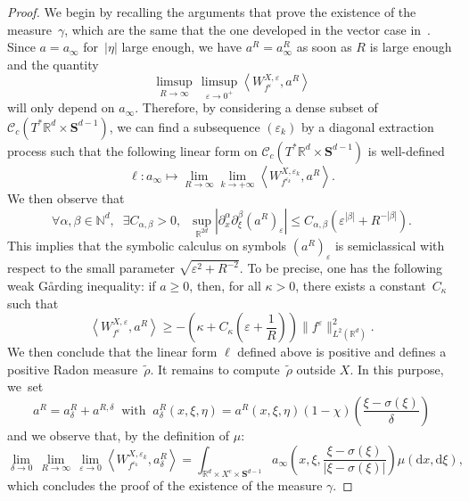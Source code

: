 \documentclass[10pt]{amsart}
\theoremstyle{definition}
\newcommand*\R{{\mathbb R}}
\newcommand*\N{{\mathbb N}}
\newcommand*\eps{\varepsilon}
\numberwithin{equation}{section}
\let\oldexists\exists
\renewcommand*{\exists}{\mathrel{\oldexists}}
\let\oldforall\forall
\renewcommand*{\forall}{\mathrel{\oldforall}}
\newcommand*{\dd}{\mathrm{d}}
\newcommand*{\dx}{\dd x}
\newcommand*{\dxi}{\dd \xi}
\begin{document}
\begin{proof}
We begin by recalling the arguments that prove the existence of the measure~$\gamma$, which are the same that the one developed in the vector case in~\cite{CFMProc}.
Since $a=a_\infty$ for~$|\eta|$ large enough, we have $a^R=a_\infty^R$ as soon as $R$ is large enough and the quantity
\[
\limsup_{R\to\infty}\, \limsup_{\eps\to 0^+}\left\langle W^{X,\eps}_{f^\eps},a^{R}\right\rangle
\]
will only depend on $a_\infty$. Therefore, by considering a dense subset of ${\mathcal C}_c(T^*\R^{d}\times \mathbf{S}^{d-1})$, we can find a subsequence $(\eps_k)$ by a diagonal extraction process such that the following linear form on ${\mathcal C}_c(T^*\R^{d}\times \mathbf{S}^{d-1})$ is well-defined
\[
\ell : a_\infty\mapsto \lim_{R\to\infty} \lim_{k\to +\infty}\left\langle W^{X,\eps_k}_{f^{\eps_k}},a^{R}\right\rangle.
\]
We then observe that
\[
\forall \alpha,\beta\in\N^d,\;\;\exists C_{\alpha,\beta}>0,\;\;\sup_{\R^{2d}}\left| \partial_x^\alpha\partial_\xi^\beta \left(a^{R}\right)_\eps\right|\leq C_{\alpha,\beta}\left(\eps^{|\beta|}+R^{-|\beta|}\right).
\]
This implies that the symbolic calculus on symbols $(a^R)_\eps$ is semiclassical with respect to the small parameter $\sqrt{\eps^2+R^{-2}}$. To be precise, one has the following weak G\aa rding inequality: if $a\geq 0$, then, for all $\kappa>0$, there exists a constant~$C_\kappa$ such that
\[
\left\langle W^{X,\eps}_{f^\eps},a^{R}\right\rangle \geq -\left(\kappa + C_\kappa \left(\eps+\frac{1}{R}\right) \right)\| f^\eps\|^2_{L^2(\R^d)}.
\]
We then conclude that the linear form $\ell$ defined above is positive and defines a positive Radon measure~$\widetilde \rho$. It remains to compute~$\widetilde\rho$ outside $X$. In this purpose, we~set
\[
a^R=a^R_\delta+a^{R,\delta}\;\;\text{with}\;\; a^{R}_{\delta}(x,\xi,\eta)= a^R(x,\xi,\eta)(1-\chi)\left(\frac{\xi-\sigma(\xi)}{\delta}\right)
\]
and we observe that, by the definition of $\mu$:
\[
\lim_{\delta\rightarrow 0} \, \lim_{R\to\infty}\,\lim_{\eps\rightarrow 0} \left\langle W^{X,\eps_k}_{f^{\eps_k}},a^{R}_{\delta}\right\rangle
= \int_{\R^d\times X^c\times \mathbf{S}^{d-1}} a_\infty \left(x,\xi,\frac{\xi-\sigma(\xi)}{|\xi-\sigma(\xi)|}\right)\mu(\dx,\dxi),
\]
which concludes the proof of the existence of the measure $\gamma$.



\end{proof}
\end{document}
